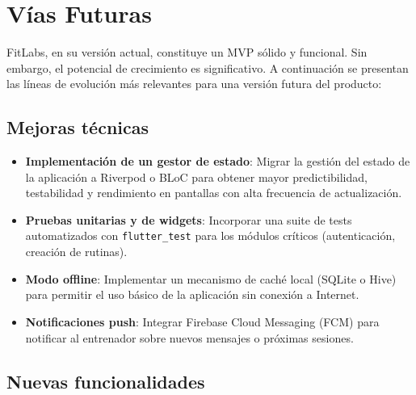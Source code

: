 \chapter{Vías Futuras}

FitLabs, en su versión actual, constituye un MVP sólido y funcional. Sin embargo, el potencial de crecimiento es significativo. A continuación se presentan las líneas de evolución más relevantes para una versión futura del producto:

\section{Mejoras técnicas}

\begin{itemize}
  \item \textbf{Implementación de un gestor de estado}: Migrar la gestión del estado de la aplicación a Riverpod o BLoC para obtener mayor predictibilidad, testabilidad y rendimiento en pantallas con alta frecuencia de actualización.
  \item \textbf{Pruebas unitarias y de widgets}: Incorporar una suite de tests automatizados con \texttt{flutter\_test} para los módulos críticos (autenticación, creación de rutinas).
  \item \textbf{Modo offline}: Implementar un mecanismo de caché local (SQLite o Hive) para permitir el uso básico de la aplicación sin conexión a Internet.
  \item \textbf{Notificaciones push}: Integrar Firebase Cloud Messaging (FCM) para notificar al entrenador sobre nuevos mensajes o próximas sesiones.
\end{itemize}

\section{Nuevas funcionalidades}

